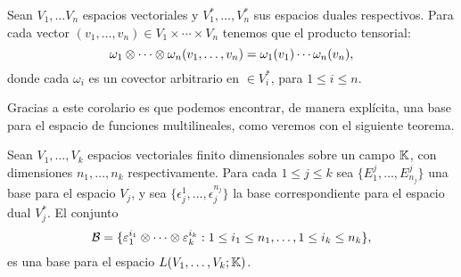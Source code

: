 \begin{corollary}
	Sean $V_1, \ldots V_n$ espacios vectoriales y $V_1^{*}, \ldots, V_{n}^{*}$
	sus espacios duales respectivos. Para cada vector $(v_1, \ldots, v_n) \in V_1
		\times \cdots \times V_n$ tenemos que el producto tensorial:
	\[
		\omega_1 \otimes \cdots \otimes \omega_n (v_1, \ldots, v_n)
		=
		\omega_1(v_1)\cdots \omega_n(v_n),
	\]
	donde cada $\omega_i$ es un covector arbitrario en $\in V_i^{*}$, para
	$1 \leq i \leq n$.
\end{corollary}

Gracias a este corolario es que podemos encontrar, de manera explícita, una
base para el espacio de funciones multilineales, como veremos con el siguiente
teorema.

\begin{theorem}
	\label{Teorema: Base para el espacio de funciones multilineales}
	Sean $V_1, \ldots, V_k$ espacios vectoriales finito dimensionales sobre un
	campo $\mathbb{K}$, con dimensiones $n_1, \ldots, n_k$ respectivamente. Para
	cada $1 \leq j \leq k$ sea $\{E_{1}^{j}, \ldots, E_{n_j}^{j} \}$ una base para el
	espacio $V_j$, y sea $\{\epsilon_{j}^{1}, \ldots, \epsilon_{j}^{n_j}\}$ la
	base correspondiente para el espacio dual $V_j^{*}$. El conjunto
	\[
		\mathcal{B} = \{\varepsilon_{1}^{i_1} \otimes \cdots \otimes \varepsilon_{k}^{i_k}
		: 1 \leq i_1 \leq n_1, \ldots, 1 \leq i_k \leq n_k\},
	\]
	es una base para el espacio $L(V_1,\ldots,V_k;\mathbb{K})$.
\end{theorem}

